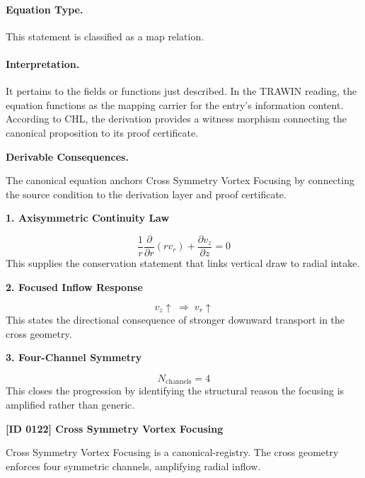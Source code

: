 \paragraph{Equation Type.}
This statement is classified as a map relation.

\paragraph{Interpretation.}
It pertains to the fields or functions just described. In the TRAWIN reading, the equation functions as the mapping carrier for the entry’s information content. According to CHL, the derivation provides a witness morphism connecting the canonical proposition to its proof certificate.

\par\vspace{0.35em}
\noindent\textbf{Derivable Consequences.}\quad
\begingroup
\footnotesize
\raggedright
The canonical equation anchors Cross Symmetry Vortex Focusing by connecting the source condition to the derivation layer and proof certificate.
\par\endgroup

\noindent\textbf{1. Axisymmetric Continuity Law}\par
\[
\frac{1}{r}\frac{\partial}{\partial r}(r v_r) + \frac{\partial v_z}{\partial z} = 0
\]
\noindent This supplies the conservation statement that links vertical draw to radial intake.\par
\noindent\textbf{2. Focused Inflow Response}\par
\[
v_z \uparrow \;\Longrightarrow\; v_r \uparrow
\]
\noindent This states the directional consequence of stronger downward transport in the cross geometry.\par
\noindent\textbf{3. Four-Channel Symmetry}\par
\[
N_{\mathrm{channels}} = 4
\]
\noindent This closes the progression by identifying the structural reason the focusing is amplified rather than generic.\par

\clearpage
\noindent\textbf{[ID 0122] Cross Symmetry Vortex Focusing}\par
\vspace{0.35em}
\begingroup\small
{}
Cross Symmetry Vortex Focusing is a canonical-registry. The cross geometry enforces four symmetric channels, amplifying radial inflow.

